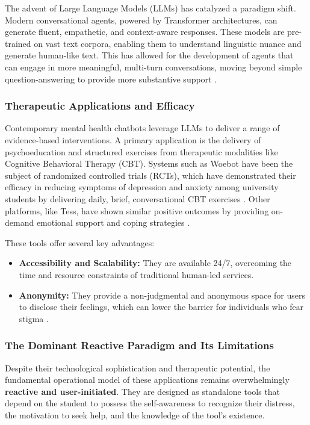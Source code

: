 The advent of Large Language Models (LLMs) has catalyzed a paradigm shift. Modern conversational agents, powered by Transformer architectures, can generate fluent, empathetic, and context-aware responses. These models are pre-trained on vast text corpora, enabling them to understand linguistic nuance and generate human-like text. This has allowed for the development of agents that can engage in more meaningful, multi-turn conversations, moving beyond simple question-answering to provide more substantive support \cite{FIND_CITATION_PLEASE}.

\subsubsection{Therapeutic Applications and Efficacy}
Contemporary mental health chatbots leverage LLMs to deliver a range of evidence-based interventions. A primary application is the delivery of psychoeducation and structured exercises from therapeutic modalities like Cognitive Behavioral Therapy (CBT). Systems such as Woebot have been the subject of randomized controlled trials (RCTs), which have demonstrated their efficacy in reducing symptoms of depression and anxiety among university students by delivering daily, brief, conversational CBT exercises \cite{FIND_CITATION_PLEASE}. Other platforms, like Tess, have shown similar positive outcomes by providing on-demand emotional support and coping strategies \cite{FIND_CITATION_PLEASE}.

These tools offer several key advantages:
\begin{itemize}
    \item \textbf{Accessibility and Scalability:} They are available 24/7, overcoming the time and resource constraints of traditional human-led services.
    \item \textbf{Anonymity:} They provide a non-judgmental and anonymous space for users to disclose their feelings, which can lower the barrier for individuals who fear stigma \cite{FIND_CITATION_PLEASE}.
\end{itemize}

\subsubsection{The Dominant Reactive Paradigm and Its Limitations}
Despite their technological sophistication and therapeutic potential, the fundamental operational model of these applications remains overwhelmingly \textbf{reactive and user-initiated}. They are designed as standalone tools that depend on the student to possess the self-awareness to recognize their distress, the motivation to seek help, and the knowledge of the tool's existence.

